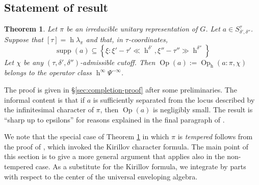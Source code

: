 \documentclass[reqno]{amsart}
\DeclareMathOperator{\h}{h}
\DeclareMathOperator{\Opp}{Op}
\DeclareMathOperator{\reg}{reg}
\DeclareMathOperator{\supp}{supp}
\theoremstyle{plain} \newtheorem{theorem} {Theorem}
\theoremstyle{definition} \newtheorem{definition} [theorem] {Definition}
\theoremstyle{itplain} %
\newcommand{\todo}[1]{{\color{blue} \sf TODO: [#1]}}
\numberwithin{equation}{section}
\numberwithin{theorem}{section}
\begin{document}
\subsection{Statement of result}
\begin{theorem}\label{thm:local-refin-symb}
  Let $\pi$ be an irreducible unitary representation of $G$.
  Let $a \in S^\tau_{\delta', \delta ''}$.  Suppose that $[\tau] = \h \lambda_\pi$ and that, in $\tau$-coordinates,
  \begin{equation}\label{eqn:xi-delta-primez-tau}
    \supp(a) \subseteq 
    \left\{\xi : \xi' - \tau ' \ll \h^{\delta '},
      \xi '' - \tau '' \gg \h^{\delta ''}
    \right\}
  \end{equation}
  Let $\chi$ be any $(\tau, \delta ', \delta '')$-admissible cutoff.  Then $\Opp(a) := \Opp_{\h}(a:\pi, \chi )$ belongs to the operator class $\h^\infty \Psi^{-\infty}$.
\end{theorem}

The proof is given in \S\ref{sec:completion-proof} after some preliminaries.  The informal content is that if $a$ is sufficiently separated from the locus described by the infinitesimal character of $\pi$, then $\Opp(a)$ is negligibly small.  The result is ``sharp up to epsilons'' for reasons explained in the final paragraph of \cite[\S2.4]{2020arXiv201202187N} .

We note that the special case of Theorem \ref{thm:local-refin-symb} in which $\pi$ is \emph{tempered} follows from the proof of \cite[Lemma 14.3]{2020arXiv201202187N}, which invoked the Kirillov character formula.  The main point of this section is to give a more general argument that applies also in the non-tempered case.  As a substitute for the Kirillov formula, we integrate by parts with respect to the center of the universal enveloping algebra.

\end{document}
